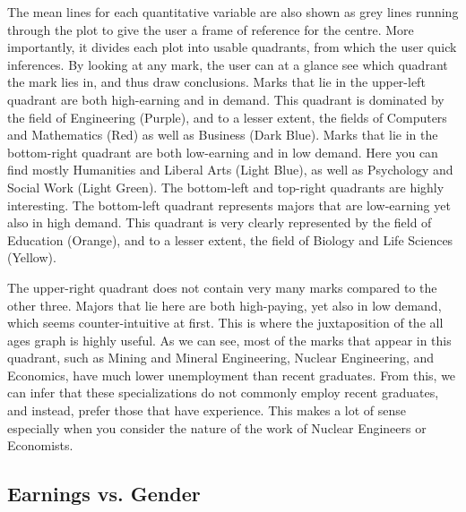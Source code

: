 \documentclass[sigchi]{acmart}
\begin{document}
The mean lines for each quantitative variable are also shown as grey lines running through the plot to give the user a frame of reference for the centre. More importantly, it divides each plot into usable quadrants, from which the user quick inferences. By looking at any mark, the user can at a glance see which quadrant the mark lies in, and thus draw conclusions. Marks that lie in the upper-left quadrant are both high-earning and in demand. This quadrant is dominated by the field of Engineering (Purple), and to a lesser extent, the fields of Computers and Mathematics (Red) as well as Business (Dark Blue). Marks that lie in the bottom-right quadrant are both low-earning and in low demand. Here you can find mostly Humanities and Liberal Arts (Light Blue), as well as Psychology and Social Work (Light Green). The bottom-left and top-right quadrants are highly interesting. The bottom-left quadrant represents majors that are low-earning yet also in high demand. This quadrant is very clearly represented by the field of Education (Orange), and to a lesser extent, the field of Biology and Life Sciences (Yellow). 

The upper-right quadrant does not contain very many marks compared to the other three. Majors that lie here are both high-paying, yet also in low demand, which seems counter-intuitive at first. This is where the juxtaposition of the all ages graph is highly useful. As we can see, most of the marks that appear in this quadrant, such as Mining and Mineral Engineering, Nuclear Engineering, and Economics, have much lower unemployment than recent graduates. From this, we can infer that these specializations do not commonly employ recent graduates, and instead, prefer those that have experience. This makes a lot of sense especially when you consider the nature of the work of Nuclear Engineers or Economists.




\subsection{Earnings vs. Gender}
\label{sec:earningsgender}
\end{document}

